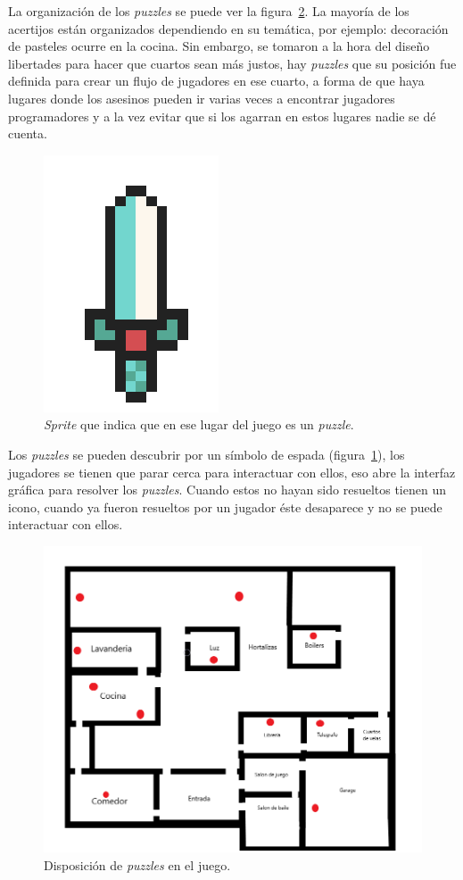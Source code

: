 La organización de los \textit{puzzles} se puede ver la figura~\ref{fig:items_on_map}. La mayoría de los acertijos están organizados dependiendo en su temática, por ejemplo: decoración de pasteles ocurre en la cocina. Sin embargo, se tomaron a la hora del diseño libertades para hacer que cuartos sean más justos, hay \textit{puzzles} que su posición fue definida para crear un flujo de jugadores en ese cuarto, a forma de que haya lugares donde los asesinos pueden ir varias veces a encontrar jugadores programadores y a la vez evitar que si los agarran en estos lugares nadie se dé cuenta.
\begin{figure}
    \centering
    \includegraphics[width=0.25\linewidth]{images/espada_sprite.png}
    \caption{\textit{Sprite} que indica que en ese lugar del juego es un \textit{puzzle}.}
    \label{fig:puzzle_location}
\end{figure}
Los \textit{puzzles} se pueden descubrir por un símbolo de espada (figura~\ref{fig:puzzle_location}), los jugadores se tienen que parar cerca para interactuar con ellos, eso abre la interfaz gráfica para resolver los \textit{puzzles}. Cuando estos no hayan sido resueltos tienen un icono, cuando ya fueron resueltos por un jugador éste desaparece y no se puede interactuar con ellos.

\begin{figure}[H]
    \centering
    \includegraphics[width=0.5\linewidth]{images/MapaJuegoConItems.png}
    \caption{Disposición de \textit{puzzles} en el juego.}
    \label{fig:items_on_map}
\end{figure}

